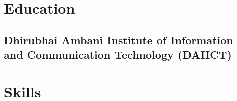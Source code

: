 \documentclass[]{deedy-resume-openfont}
\begin{document}
\begin{minipage}[t]{0.33\textwidth} 


\section{Education} 

\subsection{\texorpdfstring{Dhirubhai Ambani \newline Institute of Information \newline and Communication \newline Technology (DAIICT)}{}}
\sectionsep





\section{Skills}

\end{minipage}
\end{document}
